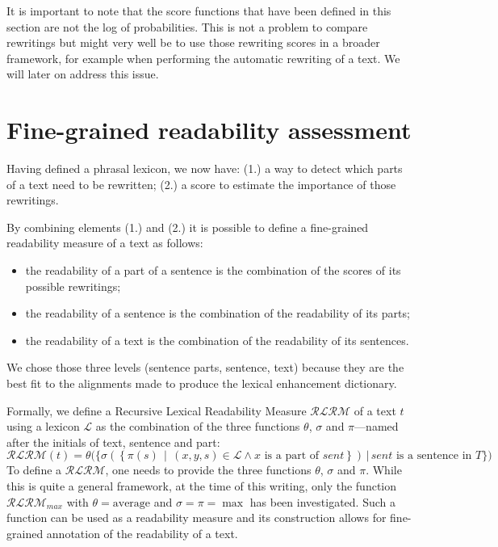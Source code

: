\documentclass[a4paper, 11pt, onepage]{scrreprt}
\newcommand\suchthat{\, \middle| \,}
\begin{document}
It is important to note that the score functions that have been
defined in this section are not the log of probabilities. This is not
a problem to compare rewritings but might very well be to use those
rewriting scores in a broader framework, for example when performing
the automatic rewriting of a text. We will later on address this
issue.

\section{Fine-grained readability assessment}
\label{sec:fine-grain-read}

Having defined a phrasal lexicon, we now have: (1.) a way to detect
which parts of a text need to be rewritten; (2.) a score to estimate
the importance of those rewritings.

By combining elements (1.) and (2.) it is possible to define a
fine-grained readability measure of a text as follows:

\begin{itemize}
\item the readability of a part of a sentence is the combination of
  the scores of its possible rewritings;
\item the readability of a sentence is the combination of the
  readability of its parts;
\item the readability of a text is the combination of the readability
  of its sentences.
\end{itemize}

We chose those three levels (sentence parts, sentence, text) because
they are the best fit to the alignments made to produce the lexical
enhancement dictionary.

Formally, we define a Recursive Lexical Readability Measure
$\mathcal{RLRM}$ of a text $t$ using a lexicon $\mathcal{L}$ as the
combination of the three functions $\theta$, $\sigma$ and $\pi$—named
after the initials of text, sentence and part:
\[
\mathcal{RLRM}(t) = \theta\Bigg(\Bigg\{ \sigma \left(\left\{ \pi(s)
    \suchthat (x, y, s) \in \mathcal{L} \land \text{$x$ is a part of $sent$}\right\}\right) \,\Bigg|\,
\text{$sent$ is a sentence in $T$} \Bigg\}\Bigg)
\]
To define a $\mathcal{RLRM}$, one needs to provide the three functions
$\theta$, $\sigma$ and $\pi$. While this is quite a general framework,
at the time of this writing, only the function $\mathcal{RLRM}_{max}$
with $\theta = \text{average}$ and $\sigma = \pi = \max$ has been
investigated. Such a function can be used as a readability measure and
its construction allows for fine-grained annotation of the readability
of a text.
\end{document}

